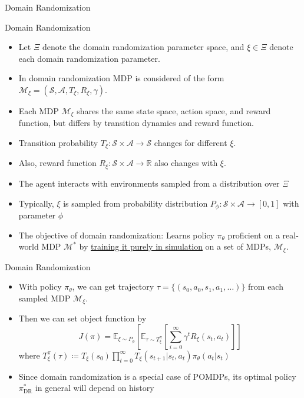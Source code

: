 \documentclass{beamer}
\newcommand{\mbb}[1]{\mathbb{#1}}
\newcommand{\mc}[1]{\mathcal{#1}}
\begin{document}
\begin{frame}{Domain Randomization}
    \begin{block}{Domain Randomization}
        \begin{itemize}
            \item Let $\Xi$ denote the domain randomization parameter space, and $\xi \in \Xi$ denote each domain randomization parameter.
            \item In domain randomization MDP is considered of the form $\mc{M}_\xi = (\mc{S}, \mc{A}, T_\xi, R_\xi, \gamma)$.
            \item Each MDP $\mc{M}_\xi$ shares the same state space, action space, and reward function, but differs by transition dynamics and reward function.
            \item Transition probability $T_\xi : \mc{S} \times \mc{A} \to \mc{S}$ changes for different $\xi$.
            \item Also, reward function $R_\xi : \mc{S} \times \mc{A} \to \mbb{R}$ also changes with $\xi$.
            \item The agent interacts with environments sampled from a distribution over $\Xi$
            \item Typically, $\xi$ is sampled from probability distribution $P_\phi : \mc{S} \times \mc{A} \to [0,1]$ with parameter $\phi$
            \item The objective of domain randomization: Learns policy $\pi_\theta$ proficient on a real-world MDP $\mc{M}^\ast$ by \underline{training it purely in simulation} on a set of MDPs, $\mc{M}_\xi$.
        \end{itemize}
    \end{block}
\end{frame}


\begin{frame}{Domain Randomization}
    \begin{itemize}
        \item With policy $\pi_\theta$, we can get trajectory $\tau=\{(s_0, a_0, s_1, a_1, \dots)\}$ from each sampled MDP $\mc{M}_\xi$.
        \item Then we can set object function by
        \[
            J(\pi) = \mbb{E}_{\xi \sim P_\phi} \left[ \mbb{E}_{\tau \sim T_\xi^{\pi}}\left[\sum_{i=0}^\infty \gamma^t R_\xi (s_t, a_t) \right] \right]
        \]
        where $T_\xi^\pi (\tau) \coloneqq T_\xi (s_0) \prod_{t=0}^\infty T_\xi (s_{t+1} | s_t, a_t) \pi_\theta (a_t | s_t)$
        \item Since domain randomization is a special case of POMDPs, its optimal policy $\pi^\ast_{\text{DR}}$ in general will depend on history
    \end{itemize}
\end{frame}
\end{document}
